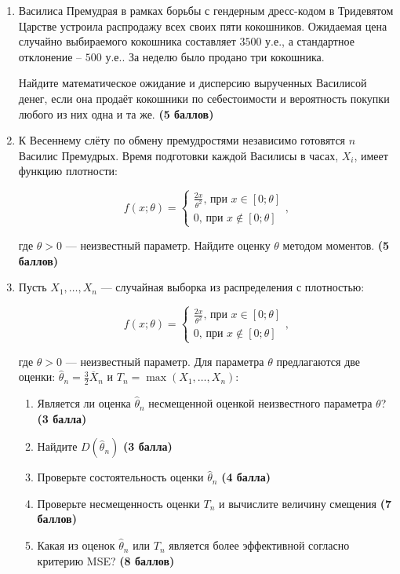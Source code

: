 \begin{enumerate}[resume]

\item Василиса Премудрая в рамках борьбы с гендерным дресс-кодом в Тридевятом Царстве устроила распродажу всех своих пяти кокошников. Ожидаемая цена случайно выбираемого кокошника составляет $3500$ у.е., а стандартное отклонение – $500$ у.е.. За неделю было продано три кокошника.

Найдите математическое ожидание и дисперсию вырученных Василисой денег, если она продаёт кокошники по себестоимости и вероятность покупки любого из них одна и та же. \textbf{(5 баллов)}

\item К Весеннему слёту по обмену премудростями
независимо готовятся $n$ Василис Премудрых.
Время подготовки каждой Василисы в часах, $X_{i}$,
имеет функцию плотности:


\[
f(x;\theta)=\begin{cases}\frac{2x}{\theta^2}\text{, при }x\in[0;\theta]\\0\text{, при }x\notin[0;\theta]\end{cases},
\]

где $\theta>0$ — неизвестный параметр.
Найдите оценку $\theta$ методом моментов. \textbf{(5 баллов)}

\item Пусть $X_{1}, \ldots, X_{n}$ — случайная выборка из распределения с плотностью:

\[
f(x;\theta)=\begin{cases}\frac{2x}{\theta^2}\text{, при }x\in[0;\theta]\\0\text{, при }x\notin[0;\theta]\end{cases},
\]


где $\theta>0$ — неизвестный параметр. Для параметра $\theta$ предлагаются две оценки: $\hat{\theta}_{n}=\frac{3}{2}\overline{X}_{n}$ и $T_{n}=\max(X_{1}, \ldots, X_{n})$:

\begin{enumerate}
\item Является ли оценка $\hat{\theta}_{n}$ несмещенной оценкой неизвестного параметра $\theta$? \textbf{(3 балла)}
\item Найдите $D(\hat{\theta}_{n})$ \textbf{(3 балла)}
\item Проверьте состоятельность оценки $\hat{\theta}_{n}$
\textbf{(4 балла)}
\item Проверьте несмещенность оценки $T_{n}$ и вычислите величину смещения \textbf{(7 баллов)}
\item Какая из оценок $\hat{\theta}_{n}$ или $T_{n}$ является более эффективной согласно критерию MSE? \textbf{(8 баллов)}
\end{enumerate}


\end{enumerate}
